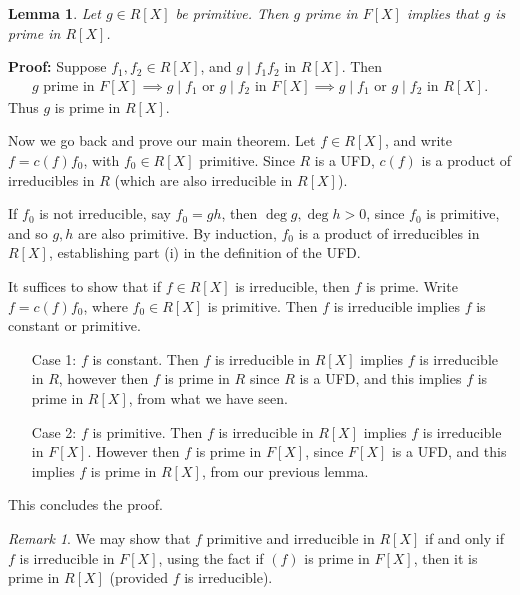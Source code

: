 \documentclass[12pt]{article}
\newtheorem{lemma}{Lemma}[section]
\theoremstyle{definition}
\theoremstyle{remark}
\newtheorem*{remark}{Remark}
\begin{document}
\begin{lemma}
	Let $g \in R[X]$ be primitive. Then $g$ prime in $F[X]$ implies that $g$ is prime in $R[X]$.
\end{lemma}

\begin{adjustbox}{minipage = \columnwidth - 25.5pt, margin=1em, frame=1pt, margin=0em}
	\textbf{Proof:} Suppose $f_1, f_2 \in R[X]$, and $g \mid f_1 f_2$ in $R[X]$. Then
	\begin{align*}
		g \text{ prime in } F[X] \implies g \mid f_1 \text{ or } g \mid f_2 \text{ in } F[X] \implies g \mid f_1 \text{ or } g \mid f_2 \text{ in } R[X].
	\end{align*}
	Thus $g$ is prime in $R[X]$.
\end{adjustbox}

Now we go back and prove our main theorem. Let $f \in R[X]$, and write $f = c(f)f_0$, with $f_0 \in R[X]$ primitive. Since $R$ is a UFD, $c(f)$ is a product of irreducibles in $R$ (which are also irreducible in $R[X]$).

If $f_0$ is not irreducible, say $f_0 = gh$, then $\deg g, \deg h > 0$, since $f_0$ is primitive, and so $g, h$ are also primitive. By induction, $f_0$ is a product of irreducibles in $R[X]$, establishing part (i) in the definition of the UFD.

It suffices to show that if $f \in R[X]$ is irreducible, then $f$ is prime. Write $f = c(f)f_0$, where $f_0 \in R[X]$ is primitive. Then $f$ is irreducible implies $f$ is constant or primitive.
\begin{itemize}
	\item[Case 1:] $f$ is constant. Then $f$ is irreducible in $R[X]$ implies $f$ is irreducible in $R$, however then $f$ is prime in $R$ since $R$ is a UFD, and this implies $f$ is prime in $R[X]$, from what we have seen.
	\item [Case 2:] $f$ is primitive. Then $f$ is irreducible in $R[X]$ implies $f$ is irreducible in $F[X]$. However then $f$ is prime in $F[X]$, since $F[X]$ is a UFD, and this implies $f$ is prime in $R[X]$, from our previous lemma.
\end{itemize}

This concludes the proof.

\begin{remark}
	We may show that $f$ primitive and irreducible in $R[X]$ if and only if $f$ is irreducible in $F[X]$, using the fact if $(f)$ is prime in $F[X]$, then it is prime in $R[X]$ (provided $f$ is irreducible).
\end{remark}
\end{document}
